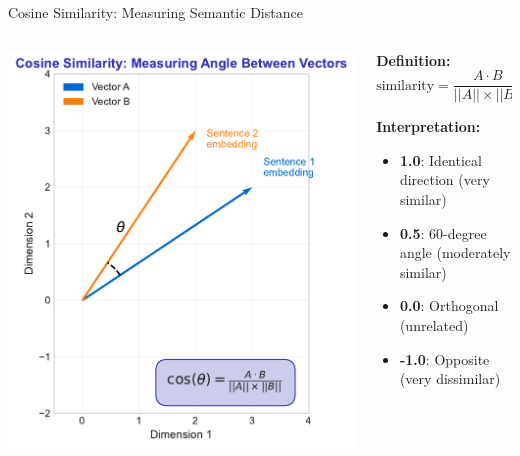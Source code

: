 \documentclass[8pt,aspectratio=169]{beamer}
\begin{document}
\begin{frame}[t]{Cosine Similarity: Measuring Semantic Distance}

\begin{columns}[t]
\begin{column}{0.45\textwidth}
\includegraphics[width=\textwidth]{charts/cosine_similarity_example.pdf}
\end{column}

\begin{column}{0.50\textwidth}
\textbf{Definition:}
\[
\text{similarity} = \frac{A \cdot B}{||A|| \times ||B||} = \cos(\theta)
\]

\vspace{0.5cm}

\textbf{Interpretation:}
\begin{itemize}
    \item \textbf{1.0}: Identical direction (very similar)
    \item \textbf{0.5}: 60-degree angle (moderately similar)
    \item \textbf{0.0}: Orthogonal (unrelated)
    \item \textbf{-1.0}: Opposite (very dissimilar)
\end{itemize}


\end{column}
\end{columns}
\end{frame}
\end{document}
